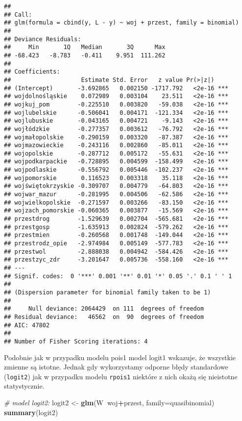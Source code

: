 \documentclass[polish,]{book}
\newenvironment{Shaded}{\begin{snugshade}}{\end{snugshade}}
\newcommand{\CommentTok}[1]{\textcolor[rgb]{0.56,0.35,0.01}{\textit{#1}}}
\newcommand{\DataTypeTok}[1]{\textcolor[rgb]{0.13,0.29,0.53}{#1}}
\newcommand{\KeywordTok}[1]{\textcolor[rgb]{0.13,0.29,0.53}{\textbf{#1}}}
\newcommand{\NormalTok}[1]{#1}
\newcommand{\OperatorTok}[1]{\textcolor[rgb]{0.81,0.36,0.00}{\textbf{#1}}}
\newcommand{\StringTok}[1]{\textcolor[rgb]{0.31,0.60,0.02}{#1}}
\begin{document}
\begin{verbatim}
## 
## Call:
## glm(formula = cbind(y, L - y) ~ woj + przest, family = binomial)
## 
## Deviance Residuals: 
##     Min       1Q   Median       3Q      Max  
## -68.423   -8.783   -0.411    9.951  111.262  
## 
## Coefficients:
##                    Estimate Std. Error   z value Pr(>|z|)    
## (Intercept)       -3.692865   0.002150 -1717.792   <2e-16 ***
## wojdolnośląskie    0.072989   0.003104    23.511   <2e-16 ***
## wojkuj_pom        -0.225510   0.003820   -59.038   <2e-16 ***
## wojlubelskie      -0.506041   0.004171  -121.334   <2e-16 ***
## wojlubuskie       -0.043165   0.004721    -9.143   <2e-16 ***
## wojłódzkie        -0.277357   0.003612   -76.792   <2e-16 ***
## wojmałopolskie    -0.290159   0.003320   -87.387   <2e-16 ***
## wojmazowieckie    -0.243116   0.002860   -85.011   <2e-16 ***
## wojopolskie       -0.287712   0.005172   -55.631   <2e-16 ***
## wojpodkarpackie   -0.728895   0.004599  -158.499   <2e-16 ***
## wojpodlaskie      -0.556792   0.005446  -102.237   <2e-16 ***
## wojpomorskie       0.116523   0.003318    35.118   <2e-16 ***
## wojświętokrzyskie -0.309707   0.004779   -64.803   <2e-16 ***
## wojwar_mazur      -0.281995   0.004506   -62.586   <2e-16 ***
## wojwielkopolskie  -0.271597   0.003266   -83.150   <2e-16 ***
## wojzach_pomorskie -0.060365   0.003877   -15.569   <2e-16 ***
## przestdrog        -1.529639   0.002704  -565.681   <2e-16 ***
## przestgosp        -1.635913   0.002824  -579.262   <2e-16 ***
## przestmien        -0.260568   0.001748  -149.044   <2e-16 ***
## przestrodz_opie   -2.974984   0.005149  -577.783   <2e-16 ***
## przestwol         -2.888038   0.004942  -584.426   <2e-16 ***
## przestzyc_zdr     -3.201647   0.005736  -558.160   <2e-16 ***
## ---
## Signif. codes:  0 '***' 0.001 '**' 0.01 '*' 0.05 '.' 0.1 ' ' 1
## 
## (Dispersion parameter for binomial family taken to be 1)
## 
##     Null deviance: 2064429  on 111  degrees of freedom
## Residual deviance:   46562  on  90  degrees of freedom
## AIC: 47802
## 
## Number of Fisher Scoring iterations: 4
\end{verbatim}

Podobnie jak w przypadku modelu pois1 model logit1 wskazuje, że wszystkie
zmienne są istotne. Jednak gdy wykorzystamy odporne błędy standardowe (\texttt{logit2})
jak w przypadku modelu \texttt{rpois1} niektóre z nich okażą się nieistotne statystycznie.

\begin{Shaded}
\begin{Highlighting}[]
\CommentTok{# model logit2:}
\NormalTok{logit2 <-}\StringTok{ }\KeywordTok{glm}\NormalTok{(W}\OperatorTok{~}\NormalTok{woj}\OperatorTok{+}\NormalTok{przest, }\DataTypeTok{family=}\NormalTok{quasibinomial)}
\KeywordTok{summary}\NormalTok{(logit2)}
\end{Highlighting}
\end{Shaded}
\end{document}
